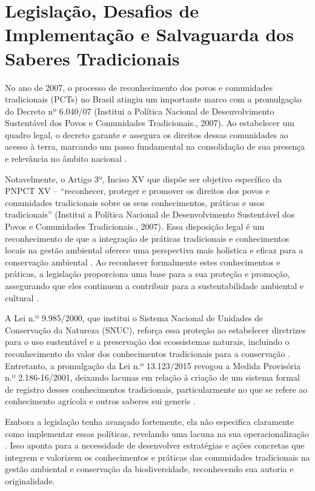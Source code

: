 \section{Legislação, Desafios de Implementação e Salvaguarda dos Saberes Tradicionais}


No ano de 2007, o processo de reconhecimento dos povos e comunidades tradicionais (PCTs) no Brasil atingiu um importante marco com a promulgação do Decreto nº 6.040/07 (Institui a Política Nacional de Desenvolvimento Sustentável dos Povos e Comunidades Tradicionais., 2007). Ao estabelecer um quadro legal, o decreto garante e assegura os direitos dessas comunidades ao acesso à terra, marcando um passo fundamental na consolidação de sua presença e relevância no âmbito nacional \cite{Yustiningrum2023}.

Notavelmente, o Artigo 3º, Inciso XV que dispõe ser objetivo específico da PNPCT XV – “reconhecer, proteger e promover os direitos dos povos e comunidades tradicionais sobre os seus conhecimentos, práticas e usos tradicionais” (Institui a Política Nacional de Desenvolvimento Sustentável dos Povos e Comunidades Tradicionais., 2007). Essa disposição legal é um reconhecimento de que a integração de práticas tradicionais e conhecimentos locais na gestão ambiental oferece uma perspectiva mais holística e eficaz para a conservação ambiental \cite{Ciocco2023}. Ao reconhecer formalmente estes conhecimentos e práticas, a legislação proporciona uma base para a sua proteção e promoção, assegurando que eles continuem a contribuir para a sustentabilidade ambiental e cultural \cite{Reyes-Garca2019}. 

A Lei n.º 9.985/2000, que institui o Sistema Nacional de Unidades de Conservação da Natureza (SNUC), reforça essa proteção ao estabelecer diretrizes para o uso sustentável e a preservação dos ecossistemas naturais, incluindo o reconhecimento do valor dos conhecimentos tradicionais para a conservação  \cite{Brasil2015}. Entretanto, a promulgação da Lei n.º 13.123/2015 revogou a Medida Provisória n.º 2.186-16/2001, deixando lacunas em relação à criação de um sistema formal de registro desses conhecimentos tradicionais, particularmente no que se refere ao conhecimento agrícola e outros saberes sui generis \cite{Gomes2016}.

Embora a legislação tenha avançado fortemente, ela não especifica claramente como implementar essas políticas, revelando uma lacuna na sua operacionalização \cite{Tsai2020}. Isso aponta para a necessidade de desenvolver estratégias e ações concretas que integrem e valorizem os conhecimentos e práticas das comunidades tradicionais na gestão ambiental e conservação da biodiversidade, reconhecendo sua autoria e originalidade.


